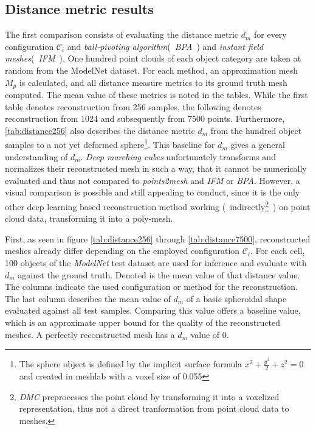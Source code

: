 \subsection{Distance metric results}
    The first comparison consists of evaluating the distance metric $d_m$ for every configuration
    $\mathcal{C}_i$ and \emph{ball-pivoting algorithm}(~\emph{BPA}~) and \emph{instant field meshes}(~\emph{IFM}~).
    One hundred point clouds of each object category are taken at random from the ModelNet dataset. For each method,
    an approximation mesh $M_{p}$ is calculated, and all distance measure metrics to its ground truth mesh computed.
    The mean value of these metrics is noted in the tables. While the first table denotes reconstruction from 256 
    samples, the following denotes reconstruction from 1024 and subsequently from 7500 points.
    Furthermore, \ref{tab:distance256} also describes the distance metric $d_m$ from the hundred object samples to a not yet deformed sphere\footnote{The sphere object is defined by 
    the implicit surface furmula $x^2+\frac{y^2}{2}+z^2=0$ and created in meshlab with a voxel size of 0.055}.
    This baseline for $d_m$ gives a general understanding of $d_m$. 
    \emph{Deep marching cubes} unfortunately transforms and normalizes their reconstructed mesh in such a way,
    that it cannot be numerically evaluated and thus not compared to \emph{points2mesh} and \emph{IFM} or \emph{BPA}.
    However, a visual comparison is possible and still appealing to conduct, since it is the only other deep learning based
    reconstruction method working (~indirectly\footnote{\emph{DMC} preprocesses the point cloud by transforming it into a voxelized representation, thus not a direct
    tranformation from point cloud data to meshes.}~) on point cloud data, transforming it into a poly-mesh.


    First, as seen in figure \ref{tab:distance256} through \ref{tab:distance7500}, reconstructed meshes already differ depending on the employed
    configuration $\mathcal{C}_i$. For each cell, 100 objects of the \emph{ModelNet} test dataset are used for inference and evaluate
    with $d_m$ against the ground truth. Denoted is the mean value of that distance value. 
    The columns indicate the used configuration or method for the reconstruction. 
    The last column describes the mean value of $d_m$ of a basic spheroidal shape evaluated against 
    all test samples. Comparing this value offers a baseline value, which is an approximate upper bound
    for the quality of the reconstructed meshes. A perfectly reconstructed mesh has a $d_m$ value of $0$.

